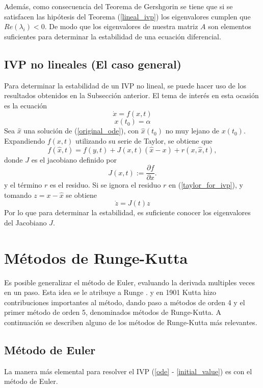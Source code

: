 Además, como consecuencia del Teorema de Gershgorin se tiene que si se satisfacen las hipótesis del Teorema (\ref{lineal_ivp}) los eigenvalores cumplen que $Re(\lambda_i) < 0$. De modo que los eigenvalores de nuestra matriz $A$ son elementos suficientes para determinar la estabilidad de una ecuación diferencial.

\subsection{IVP no lineales (El caso general)} 
\label{no_lineal_ivp}
Para determinar la estabilidad de un IVP no lineal, se puede hacer uso de los resultados obtenidos en la Subsección anterior. El tema de interés en esta ocasión es la ecuación 
\begin{equation}
    \label{original_ode}
    \dot x = f(x,t)
\end{equation}
\begin{equation}
    x(t_0) = \alpha
\end{equation}
Sea $\hat x$ una solución de (\ref{original_ode}), con $\hat x(t_0)$ no muy lejano de $x(t_0)$. Expandiendo $f(x,t)$ utilizando su serie de Taylor, se obtiene que 
\begin{equation}
    \label{taylor_for_ivp}
    f(\hat x, t) = f(y,t) + J(x,t)(\hat x - x) + r(x,\hat x, t),
\end{equation}
donde $J$ es el jacobiano definido por
\begin{equation}
    J(x, t) := \frac{\partial f}{ \partial x}.
\end{equation}
y el término $r$ es el residuo. Si se ignora el residuo $r$ en (\ref{taylor_for_ivp}), y tomando $z = x - \hat x$ se obtiene
\begin{equation}
    \dot z = J(t)z
\end{equation}
Por lo que para determinar la estabilidad, es suficiente conocer los eigenvalores del Jacobiano $J$.

\section{Métodos de Runge-Kutta}
Es posible generalizar el método de Euler, evaluando la derivada multiples veces en un paso. Esta idea se le atribuye a Runge \cite{book:110336}. y en 1901 Kutta hizo contribuciones importantes al método, dando paso a métodos de orden 4 y el primer método de orden 5, denominados métodos de Runge-Kutta. A continuación se describen alguno de los métodos de Runge-Kutta más relevantes.
\subsection{Método de Euler}
\label{section:euler_method}
La manera más elemental para resolver el IVP (\ref{ode} - \ref{initial_value}) es con el método de Euler. 

